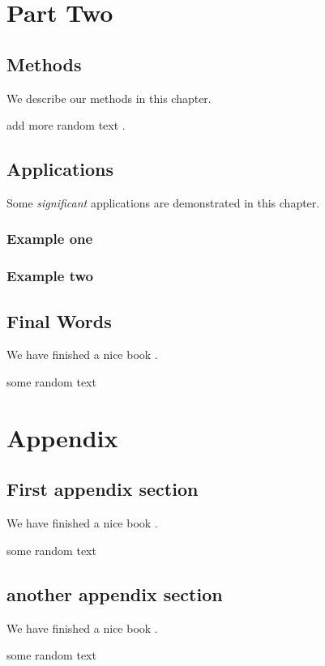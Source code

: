 \documentclass[]{book}
\theoremstyle{definition}
\theoremstyle{definition}
\theoremstyle{definition}
\theoremstyle{remark}
\begin{document}
\part{Part Two}\label{part-part-two}

\chapter{Methods}\label{methods}

We describe our methods  in this chapter.

add more random text .

\chapter{Applications}\label{applications}

Some \emph{significant} applications are demonstrated in this chapter.

\section{Example one}\label{example-one}

\section{Example two}\label{example-two}

\chapter{Final Words}\label{final-words}

We have finished a nice book .

some random  text

\part{Appendix}\label{part-appendix}

\appendix


\chapter{First appendix section}\label{first-appendix-section}

We have finished a nice book .

some random  text

\chapter{another appendix section}\label{another-appendix-section}

We have finished a nice book .

some random  text



\printindex
\end{document}
